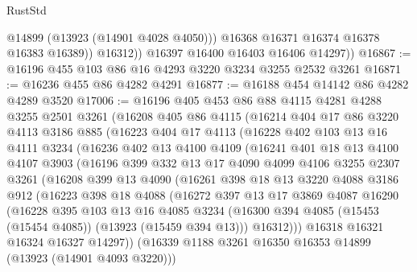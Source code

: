 \begin{lexlean}{RustStd}
\begin{coremodule}
                  @14899
                  (@13923 (@14901 @4028 @4050)))
                @16368
                @16371
                @16374
                @16378
                @16383
                @16389))
            @16312))
        @16397
        @16400
        @16403
        @16406
        @14297))
@16867 := @16196 @455 @103 @86 @16 @4293 @3220 @3234 @3255 @2532 @3261
@16871 := @16236 @455 @86 @4282 @4291
@16877 := @16188 @454 @14142 @86 @4282 @4289 @3520
@17006 := @16196
    @405
    @453
    @86
    @88
    @4115
    @4281
    @4288
    @3255
    @2501
    @3261
    (@16208
      @405
      @86
      @4115
      (@16214
        @404
        @17
        @86
        @3220
        @4113
        @3186
        @885
        (@16223
          @404
          @17
          @4113
          (@16228
            @402
            @103
            @13
            @16
            @4111
            @3234
            (@16236
              @402
              @13
              @4100
              @4109
              (@16241
                @401
                @18
                @13
                @4100
                @4107
                @3903
                (@16196
                  @399
                  @332
                  @13
                  @17
                  @4090
                  @4099
                  @4106
                  @3255
                  @2307
                  @3261
                  (@16208
                    @399
                    @13
                    @4090
                    (@16261
                      @398
                      @18
                      @13
                      @3220
                      @4088
                      @3186
                      @912
                      (@16223
                        @398
                        @18
                        @4088
                        (@16272
                          @397
                          @13
                          @17
                          @3869
                          @4087
                          @16290
                          (@16228
                            @395
                            @103
                            @13
                            @16
                            @4085
                            @3234
                            (@16300 @394 @4085 (@15453 (@15454 @4085)) (@13923 (@15459 @394 @13)))
                            @16312)))
                      @16318
                      @16321
                      @16324
                      @16327
                      @14297))
                  (@16339 @1188 @3261 @16350 @16353 @14899 (@13923 (@14901 @4093 @3220)))

\end{coremodule}
\end{lexlean}
